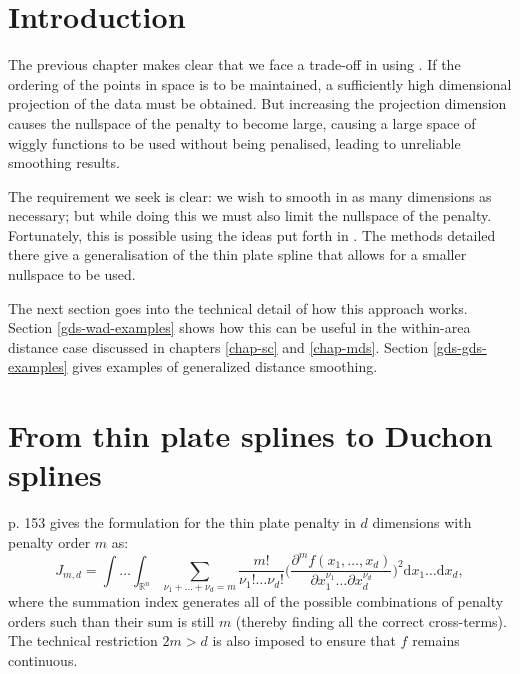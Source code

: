 
\label{chap-gds}


\section{Introduction}

The previous chapter makes clear that we face a trade-off in using \mdsap. If the ordering of the points in space is to be maintained, a sufficiently high dimensional projection of the data must be obtained. But increasing the projection dimension causes the nullspace of the penalty to become large, causing a large space of wiggly functions to be used without being penalised, leading to unreliable smoothing results. 

The requirement we seek is clear: we wish to smooth in as many dimensions as necessary; but while doing this we must also limit the nullspace of the penalty. Fortunately, this is possible using the ideas put forth in \cite{duchon77}. The methods detailed there give a generalisation of the thin plate spline that allows for a smaller nullspace to be used.

The next section goes into the technical detail of how this approach works. Section \ref{gds-wad-examples} shows how this can be useful in the within-area distance case discussed in chapters \ref{chap-sc} and \ref{chap-mds}. Section \ref{gds-gds-examples} gives examples of generalized distance smoothing.

\section{From thin plate splines to Duchon splines}
\label{gds-tprstoduchon}

\cite{simonbook} p. 153 gives the formulation for the thin plate penalty in $d$ dimensions with penalty order $m$ as:
\begin{equation}
J_{m,d} = \int \ldots \int_{\mathbb{R}^n} \sum_{\nu_1 + \dots + \nu_d=m} \frac{m!}{\nu_1! \dots \nu_d!}\Big( \frac{\partial^m f(x_1,\dots,x_d)}{\partial x_1^{\nu_1} \ldots  \partial x_d^{\nu_d}} \Big)^2 \text{d} x_1 \ldots  \text{d} x_d,
\label{tprs-pen}
\end{equation}
where the summation index generates all of the possible combinations of penalty orders such than their sum is still $m$ (thereby finding all the correct cross-terms). The technical restriction $2m>d$ is also imposed to ensure that $f$ remains continuous.

